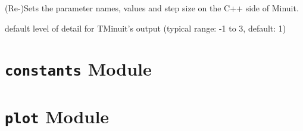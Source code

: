 \documentclass[a4paper,10pt,english]{sphinxmanual}
\begin{document}
\begin{fulllineitems}
\begin{fulllineitems}
\end{fulllineitems}


\begin{fulllineitems}
\label{index:kafe.minuit.Minuit.update_parameter_data}
(Re-)Sets the parameter names, values and step size on the
C++ side of Minuit.

\end{fulllineitems}


\end{fulllineitems}


\begin{fulllineitems}
\label{index:kafe.minuit.P_DETAIL_LEVEL}
default level of detail for TMinuit's output
(typical range: -1 to 3, default: 1)

\end{fulllineitems}



\section{\texttt{constants} Module}
\label{index:constants-module}\label{index:module-kafe.constants}\label{index:module-constants}

\section{\texttt{plot} Module}
\label{index:module-kafe.plot}\label{index:plot-module}\label{index:module-plot}
\end{document}

